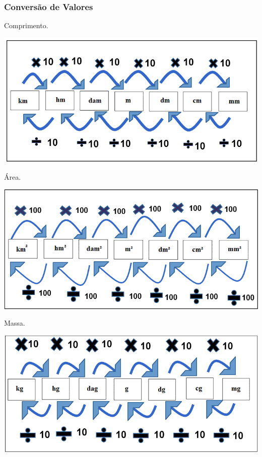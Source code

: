 \subsubsection{Conversão de Valores}
\begin{multicols}{2}
\begin{flushleft}
Comprimento.
\end{flushleft}
\includegraphics[scale=0.3]{figuras/conversao_comprimento.png}
\begin{flushleft}
Área.
\end{flushleft}
\includegraphics[scale=0.3]{figuras/conversao_area.png}
\begin{flushleft}
Massa.
\end{flushleft}
\includegraphics[scale=0.3]{figuras/conversao_massa.png}

\end{multicols}
